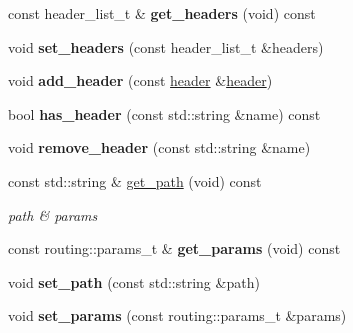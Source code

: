 \begin{DoxyCompactItemize}
const header\+\_\+list\+\_\+t \& {\bfseries get\+\_\+headers} (void) const
\item 
\mbox{\label{classnetflex_1_1http_1_1request_aacda09c64841cb272c08262b6bae68a8}} 
void {\bfseries set\+\_\+headers} (const header\+\_\+list\+\_\+t \&headers)
\item 
\mbox{\label{classnetflex_1_1http_1_1request_a18b1513d2b6a274cae832ad13dbe7760}} 
void {\bfseries add\+\_\+header} (const \hyperlink{structnetflex_1_1http_1_1header}{header} \&\hyperlink{structnetflex_1_1http_1_1header}{header})
\item 
\mbox{\label{classnetflex_1_1http_1_1request_a906fb3043367133866daa9f18ad97393}} 
bool {\bfseries has\+\_\+header} (const std\+::string \&name) const
\item 
\mbox{\label{classnetflex_1_1http_1_1request_ab598096641d91c5dc961e153cf47e445}} 
void {\bfseries remove\+\_\+header} (const std\+::string \&name)
\item 
\mbox{\label{classnetflex_1_1http_1_1request_a15483d8fc6a9af72832cb38b12457edf}} 
const std\+::string \& \hyperlink{classnetflex_1_1http_1_1request_a15483d8fc6a9af72832cb38b12457edf}{get\+\_\+path} (void) const
\begin{DoxyCompactList}\small\item\em path \& params \end{DoxyCompactList}\item 
\mbox{\label{classnetflex_1_1http_1_1request_a3c1cf98cae207060ee3f456a5bda0335}} 
const routing\+::params\+\_\+t \& {\bfseries get\+\_\+params} (void) const
\item 
\mbox{\label{classnetflex_1_1http_1_1request_a54a7cd43699b222513b38621852c1c09}} 
void {\bfseries set\+\_\+path} (const std\+::string \&path)
\item 
\mbox{\label{classnetflex_1_1http_1_1request_afaf8bbb7e3b359b96991bf8b4fa6e807}} 
void {\bfseries set\+\_\+params} (const routing\+::params\+\_\+t \&params)

\end{DoxyCompactItemize}
